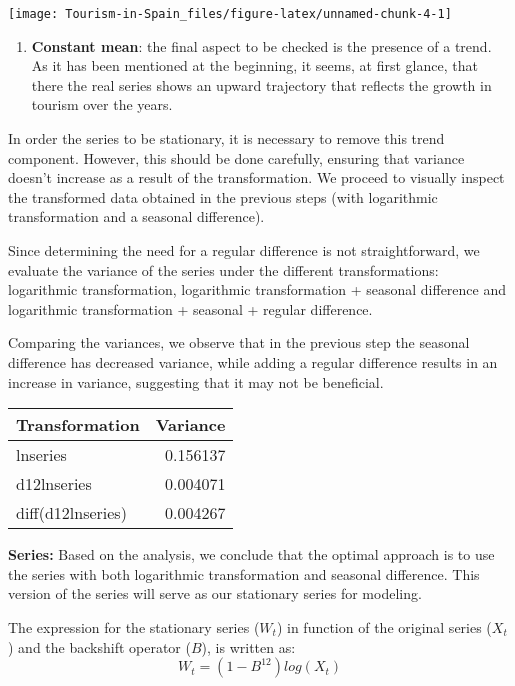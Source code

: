\documentclass[
]{article}
\providecommand{\tightlist}{%
  \setlength{\itemsep}{0pt}\setlength{\parskip}{0pt}}
\begin{document}
\begin{center}\texttt{[image: Tourism-in-Spain\_files/figure-latex/unnamed-chunk-4-1]} \end{center}

\begin{enumerate}
\def\labelenumi{\arabic{enumi}.}
\setcounter{enumi}{1}
\tightlist
\item
  \textbf{Constant mean}: the final aspect to be checked is the presence
  of a trend. As it has been mentioned at the beginning, it seems, at
  first glance, that there the real series shows an upward trajectory
  that reflects the growth in tourism over the years.
\end{enumerate}

In order the series to be stationary, it is necessary to remove this
trend component. However, this should be done carefully, ensuring that
variance doesn't increase as a result of the transformation. We proceed
to visually inspect the transformed data obtained in the previous steps
(with logarithmic transformation and a seasonal difference).

Since determining the need for a regular difference is not
straightforward, we evaluate the variance of the series under the
different transformations: logarithmic transformation, logarithmic
transformation + seasonal difference and logarithmic transformation +
seasonal + regular difference.

Comparing the variances, we observe that in the previous step the
seasonal difference has decreased variance, while adding a regular
difference results in an increase in variance, suggesting that it may
not be beneficial.

\begin{longtable}[]{@{}lr@{}}
\toprule\noalign{}
Transformation & Variance \\
\midrule\noalign{}
\endhead
\bottomrule\noalign{}
\endlastfoot
lnseries & 0.156137 \\
d12lnseries & 0.004071 \\
diff(d12lnseries) & 0.004267 \\
\end{longtable}

\textbf{Series:} Based on the analysis, we conclude that the optimal
approach is to use the series with both logarithmic transformation and
seasonal difference. This version of the series will serve as our
stationary series for modeling.

The expression for the stationary series (\(W_t\)) in function of the
original series (\(X_t\)) and the backshift operator (\(B\)), is written
as:\[W_t = (1-B^{12})log(X_t)\]
\end{document}
